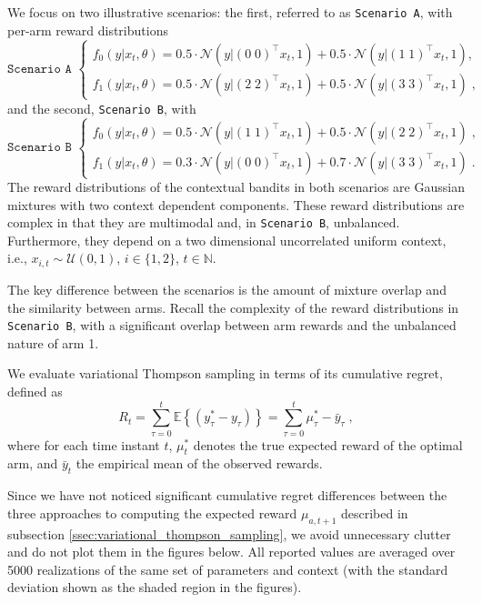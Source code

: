 \documentclass{article}
\def \Natural{{\mathbb N}}
\newcommand{\eValue}[1]{\mathbb{E}\left\{ #1 \right\}}
\newcommand{\ie}{i.e., }
\newcommand{\N}[1]{\mathcal{N}\left( #1\right)}
\newcommand{\U}[1]{\mathcal{U}\left( #1\right)}
\begin{document}
We focus on two illustrative scenarios: the first, referred to as \texttt{Scenario A}, with per-arm reward distributions
\begin{equation}
\texttt{Scenario A }\begin{cases}
f_{0}(y|x_t,\theta) = 0.5 \cdot \N{y|(0 \; 0)^\top x_t , 1} + 0.5 \cdot \N{y|(1 \; 1)^\top x_t , 1},\\
f_{1}(y|x_t,\theta) = 0.5 \cdot \N{y|(2 \; 2)^\top x_t , 1} + 0.5 \cdot \N{y|(3 \; 3)^\top x_t , 1} \; ,
\end{cases}
\label{eq:scenario_A}
\end{equation}
and the second, \texttt{Scenario B}, with
\begin{equation}
\texttt{Scenario B }\begin{cases}
f_{0}(y|x_t,\theta) = 0.5 \cdot \N{y|(1 \; 1)^\top x_t , 1} + 0.5 \cdot \N{y|(2 \; 2)^\top x_t , 1} \; ,\\
f_{1}(y|x_t,\theta) = 0.3 \cdot \N{y|(0 \; 0)^\top x_t , 1} + 0.7 \cdot \N{y|(3 \; 3)^\top x_t , 1} \; .
\end{cases}
\label{eq:scenario_B}
\end{equation}
The reward distributions of the contextual bandits in both scenarios are Gaussian mixtures with two context dependent components.  These reward distributions are complex in that they are multimodal and, in \texttt{Scenario B}, unbalanced. Furthermore, they depend on a two dimensional uncorrelated uniform context, \ie $x_{i,t}\sim\U{0,1}$, $i\in\{1,2\}$, $t\in \Natural$.

The key difference between the scenarios is the amount of mixture overlap and the similarity between arms. Recall the complexity of the reward distributions in \texttt{Scenario B}, with a significant overlap between arm rewards and the unbalanced nature of arm 1.

We evaluate variational Thompson sampling in terms of its cumulative regret, defined as
\begin{equation}
R_t=\sum_{\tau=0}^t \eValue{\left(y^*_{\tau}-y_{\tau} \right)} = \sum_{\tau=0}^t \mu_\tau^*-\bar{y}_{\tau} \; ,
\end{equation}
where for each time instant $t$, $\mu_t^*$ denotes the true expected reward of the optimal arm, and $\bar{y}_{t}$ the empirical mean of the observed rewards.

Since we have not noticed significant cumulative regret differences between the three approaches to computing the expected reward $\mu_{a,t+1}$ described in subsection \ref{ssec:variational_thompson_sampling}, we avoid unnecessary clutter and do not plot them in the figures below. All reported values are averaged over 5000 realizations of the same set of parameters and context (with the standard deviation shown as the shaded region in the figures).
\end{document}
